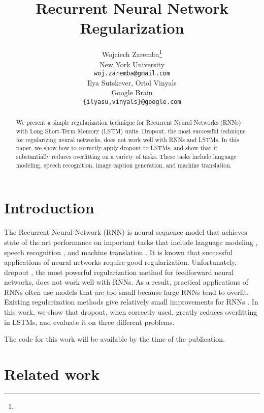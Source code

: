 \documentclass{article} %
\title{Recurrent Neural Network Regularization}
\author{
	Wojciech Zaremba\footnote{}\footnotetext{Work done while the author was in Google Brain.} \\
	New York University\\
	\texttt{woj.zaremba@gmail.com} \\
	\And
	Ilya Sutskever, Oriol Vinyals \\
	Google Brain \\
	\texttt{\{ilyasu,vinyals\}@google.com} \\
}
\begin{document}
	
	
	\maketitle
	
	\begin{abstract}
		We present a simple regularization technique for Recurrent Neural
		Networks (RNNs) with Long Short-Term Memory (LSTM) units.  Dropout,
		the most successful technique for regularizing neural networks, does
		not work well with RNNs and LSTMs.  In this paper, we show how to
		correctly apply dropout to LSTMs, and show that it
		substantially reduces overfitting on a variety of tasks. These tasks
		include language modeling, speech recognition, image caption generation, and machine
		translation.
	\end{abstract}
	
	
	\section{Introduction}
	
	The Recurrent Neural Network (RNN) is neural sequence model that achieves state of the art
	performance on important tasks that include language modeling
	\cite{mikolov2012statistical}, speech recognition
	\cite{graves2013speech}, and machine translation
	\cite{kal13}.  It is known that successful applications of
	neural networks require good regularization. Unfortunately, dropout
	\cite{srivastava2013improving}, the most powerful regularization method
	for feedforward neural networks, does not work well with
	RNNs. As a result, practical applications of RNNs often
	use models that are too small because large RNNs tend to overfit.  
	Existing regularization methods give relatively small improvements for
	RNNs \cite{graves2013generating}.
	In this work, we show that dropout, when correctly used,
	greatly reduces overfitting in LSTMs, and evaluate it on three different problems.
	
	
	The code for this work will be available by the time of the publication.
	
	\section{Related work}
	
\end{document}
